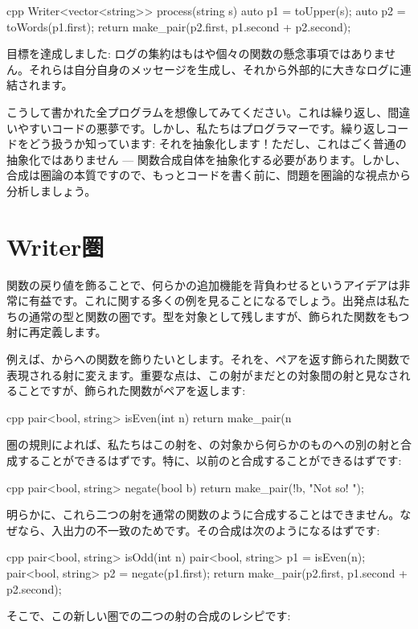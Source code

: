 \begin{snip}{cpp}
Writer<vector<string>> process(string s) {
    auto p1 = toUpper(s);
    auto p2 = toWords(p1.first);
    return make_pair(p2.first, p1.second + p2.second);
}
\end{snip}
目標を達成しました: ログの集約はもはや個々の関数の懸念事項ではありません。それらは自分自身のメッセージを生成し、それから外部的に大きなログに連結されます。

こうして書かれた全プログラムを想像してみてください。これは繰り返し、間違いやすいコードの悪夢です。しかし、私たちはプログラマーです。繰り返しコードをどう扱うか知っています: それを抽象化します！ただし、これはごく普通の抽象化ではありません --- 関数合成自体を抽象化する必要があります。しかし、合成は圏論の本質ですので、もっとコードを書く前に、問題を圏論的な視点から分析しましょう。

\section{Writer圏}

関数の戻り値を飾ることで、何らかの追加機能を背負わせるというアイデアは非常に有益です。これに関する多くの例を見ることになるでしょう。出発点は私たちの通常の型と関数の圏です。型を対象として残しますが、飾られた関数をもつ射に再定義します。

例えば、からへの関数を飾りたいとします。それを、ペアを返す飾られた関数で表現される射に変えます。重要な点は、この射がまだとの対象間の射と見なされることですが、飾られた関数がペアを返します:

\begin{snip}{cpp}
pair<bool, string> isEven(int n) {
    return make_pair(n %
}
\end{snip}
圏の規則によれば、私たちはこの射を、の対象から何らかのものへの別の射と合成することができるはずです。特に、以前のと合成することができるはずです:

\begin{snip}{cpp}
pair<bool, string> negate(bool b) {
    return make_pair(!b, "Not so! ");
}
\end{snip}
明らかに、これら二つの射を通常の関数のように合成することはできません。なぜなら、入出力の不一致のためです。その合成は次のようになるはずです:

\begin{snip}{cpp}
pair<bool, string> isOdd(int n) {
    pair<bool, string> p1 = isEven(n);
    pair<bool, string> p2 = negate(p1.first);
    return make_pair(p2.first, p1.second + p2.second);
}
\end{snip}
そこで、この新しい圏での二つの射の合成のレシピです: 

